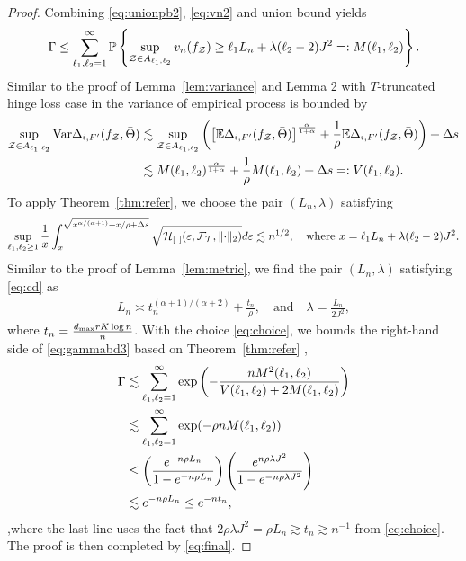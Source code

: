\documentclass[11pt]{article}
\theoremstyle{plain}
\theoremstyle{definition}
\begin{document}
\begin{proof}
Combining \eqref{eq:unionpb2},  \eqref{eq:vn2} and union bound yields
\begin{align}\label{eq:gammabd3}
\Gamma\leq \sum_{\ell_1,\ell_2=1}^\infty\mathbb{P}\left\{\sup_{\mathcal{Z}\in A_{\ell_1,\ell_2}} v_n(f_{\mathcal{Z}})\geq  \ell_1 L_n+\lambda(\ell_2-2)J^2=:M(\ell_1,\ell_2) \right\}.
\end{align}
Similar to the proof of Lemma~\ref{lem:variance} and Lemma 2 with $T$-truncated hinge loss case in \cite{lee2021nonparametric} the variance of empirical process is bounded by 
\begin{align}
\sup_{\mathcal{Z}\in A_{\ell_1,\ell_2}}\textup{Var}\Delta_{i,F'}(f_{\mathcal{Z}},\bar \Theta)& \lesssim \sup_{\mathcal{Z}\in A_{\ell_1,\ell_2}}\left( \left[\mathbb{E}\Delta_{i,F'}(f_{\mathcal{Z}},\bar \Theta)\right]^{\alpha \over 1+\alpha}+{1\over \rho}\mathbb{E}\Delta_{i,F'}(f_{\mathcal{Z}},\bar \Theta)\right)+\Delta s \\&\lesssim M(\ell_1,\ell_2)^{\alpha\over 1+\alpha}+\frac{1}{\rho}M(\ell_1,\ell_2) +\Delta s =: V(\ell_1,\ell_2).
\end{align}
To apply Theorem~\ref{thm:refer}, we choose the pair $(L_n,\lambda)$ satisfying
\begin{align}\label{eq:cd}
\sup_{\ell_1,\ell_2\geq 1}{1\over x}\int_{x}^{\sqrt{x^{\alpha/(\alpha+1)}+x/\rho+\Delta s}}\sqrt{\tH_{[\ ]}(\varepsilon, \tF_{\tT},\vnormSize{}{\cdot})}d\varepsilon \lesssim n^{1/2}, \quad \text{where }x=\ell_1 L_n+\lambda(\ell_2-2)J^2.
\end{align}
Similar to the proof of Lemma~\ref{lem:metric},  we find the pair  $(L_n,\lambda)$ satisfying \eqref{eq:cd} as
\begin{align}\label{eq:choice}
L_n\asymp t_n^{(\alpha+1)/(\alpha+2)}+\frac{t_n}{\rho},\quad\text{and}\quad\lambda =  \frac{L_n}{2J^2},
\end{align}where $ t_n={d_{\max}rK\log n \over n}$.
With the choice \eqref{eq:choice},  we bounds the right-hand side of \eqref{eq:gammabd3} based on Theorem~\ref{thm:refer} , 
\begin{align}\label{eq:gammabd4}
\Gamma&\lesssim \sum_{\ell_1,\ell_2=1}^\infty \exp\left(-\frac{nM^2(\ell_1,\ell_2)}{V(\ell_1,\ell_2)+2M(\ell_1,\ell_2)}\right)\\&\lesssim \sum_{\ell_1,\ell_2=1}^\infty	\exp(-\rho  n M(\ell_1,\ell_2))\\&\leq \left(e^{-n\rho L_n}\over 1-e^{-n\rho L_n}\right)\left(e^{n\rho \lambda J^2}\over 1-e^{-n\rho \lambda J^2}\right)\\&\lesssim e^{-n\rho L_n}\leq e^{-nt_n},
\end{align},where the last line uses the fact that $2\rho\lambda J^2= \rho L_n\gtrsim t_n\gtrsim n^{-1}$ from \eqref{eq:choice}. The proof is then completed by \eqref{eq:final}.
\end{proof}
\end{document}
